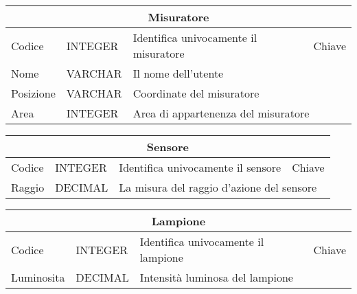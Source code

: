 \begin{tabular}{|llll|}
    \hline
    \multicolumn{4}{|c|}{\textbf{Misuratore}}                                                                                            \\ \hline
    \multicolumn{1}{|l|}{Codice}    & \multicolumn{1}{l|}{INTEGER} & \multicolumn{1}{l|}{Identifica univocamente il misuratore} & Chiave \\ \hline
    \multicolumn{1}{|l|}{Nome}      & \multicolumn{1}{l|}{VARCHAR} & \multicolumn{2}{l|}{Il nome dell'utente}                            \\ \hline
    \multicolumn{1}{|l|}{Posizione} & \multicolumn{1}{l|}{VARCHAR} & \multicolumn{2}{l|}{Coordinate del misuratore}                      \\ \hline
    \multicolumn{1}{|l|}{Area}      & \multicolumn{1}{l|}{INTEGER} & \multicolumn{2}{l|}{Area di appartenenza del misuratore}            \\ \hline
\end{tabular}

\begin{tabular}{|llll|}
    \hline
    \multicolumn{4}{|c|}{\textbf{Sensore}}                                                                                         \\ \hline
    \multicolumn{1}{|l|}{Codice} & \multicolumn{1}{l|}{INTEGER} & \multicolumn{1}{l|}{Identifica univocamente il sensore} & Chiave \\ \hline
    \multicolumn{1}{|l|}{Raggio} & \multicolumn{1}{l|}{DECIMAL} & \multicolumn{2}{l|}{La misura del raggio d'azione del sensore}   \\ \hline
\end{tabular}

\begin{tabular}{|llll|}
    \hline
    \multicolumn{4}{|c|}{\textbf{Lampione}}                                                                                             \\ \hline
    \multicolumn{1}{|l|}{Codice}     & \multicolumn{1}{l|}{INTEGER} & \multicolumn{1}{l|}{Identifica univocamente il lampione} & Chiave \\ \hline
    \multicolumn{1}{|l|}{Luminosita} & \multicolumn{1}{l|}{DECIMAL} & \multicolumn{2}{l|}{Intensità luminosa del lampione}              \\ \hline
\end{tabular}
